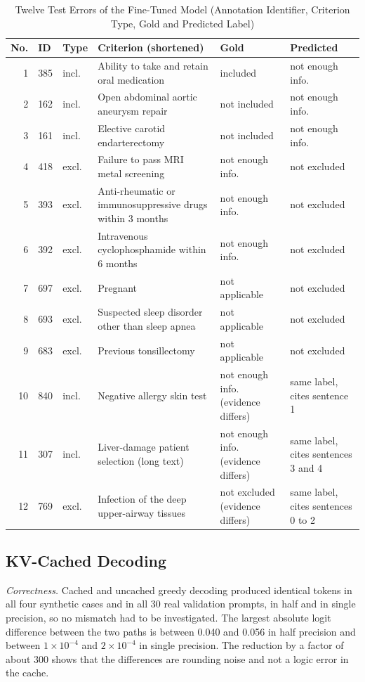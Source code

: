 \documentclass[conference]{IEEEtran}
\begin{document}
\begin{table}[!t]
\caption{Twelve Test Errors of the Fine-Tuned Model (Annotation Identifier, Criterion Type, Gold and Predicted Label)}
\label{tab:cases}
\centering
\footnotesize
\setlength{\tabcolsep}{4pt}
\begin{tabular}{rllL{0.30\textwidth}L{0.14\textwidth}L{0.14\textwidth}}
\toprule
No. & ID & Type & Criterion (shortened) & Gold & Predicted \\
 & 385 & incl. & Ability to take and retain oral medication & included & not enough info. \\
2 & 162 & incl. & Open abdominal aortic aneurysm repair & not included & not enough info. \\
3 & 161 & incl. & Elective carotid endarterectomy & not included & not enough info. \\
4 & 418 & excl. & Failure to pass MRI metal screening & not enough info. & not excluded \\
5 & 393 & excl. & Anti-rheumatic or immunosuppressive drugs within 3 months & not enough info. & not excluded \\
6 & 392 & excl. & Intravenous cyclophosphamide within 6 months & not enough info. & not excluded \\
7 & 697 & excl. & Pregnant & not applicable & not excluded \\
8 & 693 & excl. & Suspected sleep disorder other than sleep apnea & not applicable & not excluded \\
9 & 683 & excl. & Previous tonsillectomy & not applicable & not excluded \\
10 & 840 & incl. & Negative allergy skin test & not enough info. (evidence differs) & same label, cites sentence 1 \\
11 & 307 & incl. & Liver-damage patient selection (long text) & not enough info. (evidence differs) & same label, cites sentences 3 and 4 \\
12 & 769 & excl. & Infection of the deep upper-airway tissues & not excluded (evidence differs) & same label, cites sentences 0 to 2 \\
\bottomrule
\end{tabular}
\end{table}

\subsection{KV-Cached Decoding}\label{sec:kvres}
\emph{Correctness.} Cached and uncached greedy decoding produced identical tokens in all four synthetic cases and in all 30 real validation prompts, in half and in single precision, so no mismatch had to be investigated. The largest absolute logit difference between the two paths is between 0.040 and 0.056 in half precision and between $1\times10^{-4}$ and $2\times10^{-4}$ in single precision. The reduction by a factor of about 300 shows that the differences are rounding noise and not a logic error in the cache.
\end{document}

